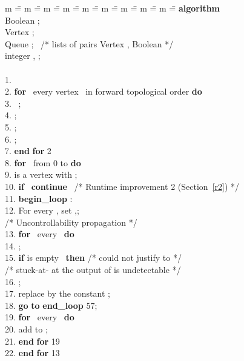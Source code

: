 \documentclass[conference]{IEEEtran} \usepackage{times}
\newcommand{\ALGORITHM}{\textbf{algorithm} }
\newcommand{\BL}{\textbf{begin\_loop} }
\newcommand{\END}{\textbf{end} }
\newcommand{\EL}{\textbf{end\_loop} }
\newcommand{\DO}{\textbf{do} }
\newcommand{\FOR}{\textbf{for} }
\newcommand{\IF}{\textbf{if} }
\newcommand{\THEN}{\textbf{then} }
\newcommand{\GO}{\textbf{go} }
\newcommand{\TO}{\textbf{to} }
\newcommand{\CONTINUE}{\textbf{continue} }
\begin{document}
\begin{figure}[t!]
\begin{center} 
{\scriptsize
\begin{tabbing} 
m \== m \== m \== m \== m \== m \== m \== m \== m \== \kill
\ALGORITHM  \\ 
\> Boolean ; \\
\> Vertex  ; \\
\> Queue   ; \ /* lists of pairs Vertex , Boolean  */ \\ 
\> integer , ; \\ \\

1. \>  \\
2. \> \FOR \ every vertex  \ in forward topological order \DO \\ 
3. \> \>  ~; \\
4. \> \> ; \\
5. \> \> ; \\
6. \> \> ; \\
7. \> \END \FOR 2 \\

8. \> \FOR \  from 0 to  \DO \\
9. \> \>  is a vertex with ; \\ 
10. \> \> \IF \  \CONTINUE \ /* Runtime improvement 2 (Section~\ref{r2}) */ \\

11. \> \> \BL: \\
12. \> \> For every , set ,; \\ 
/* Uncontrollability propagation */ \\
13. \> \> \FOR \ every  \ \DO \\ 
14. \> \> \> ; \\
15. \> \> \> \IF   is empty \ \THEN /* could not justify  to  */ \\
\> \> \> \> /* stuck-at- at the output of   is undetectable */ \\
16. \> \> \> \> ; \\
17. \> \> \> \> replace  by the constant ; \\
18.  \> \> \> \> \GO \TO \EL 57; \\

19. \> \> \> \FOR \ every  \ \DO \\ 
20. \> \> \> \> add  to ; \\
21. \> \> \> \END \FOR 19 \\

22. \> \> \END \FOR 13 \\


\end{tabbing}}
\end{center}
\end{figure}
\end{document}
